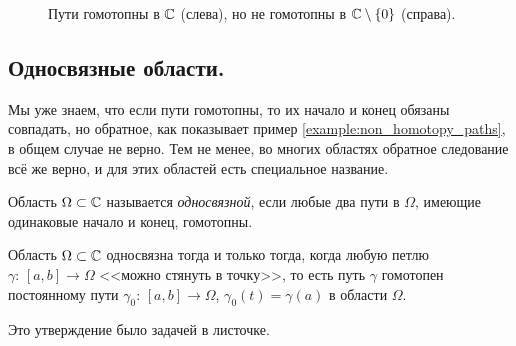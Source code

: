 \documentclass[../complex-analysis.tex]{subfiles}
\begin{document}
\begin{figure}[ht]
 \centering
 \caption{Пути гомотопны в $\mathbb{C}$ (слева), но не гомотопны в $\mathbb{C} \setminus \left\{ 0 \right\}$ (справа).}
 \label{fig:paths-without-homptopy}
\end{figure}

\subsection{Односвязные области.}

Мы уже знаем, что если пути гомотопны, то их начало и конец обязаны совпадать, но обратное, как показывает пример \ref{example:non_homotopy_paths}, в общем случае не верно. Тем не менее, во многих областях обратное следование всё же верно, и для этих областей есть специальное название.

\begin{df}
 Область $ \Omega \subset\mathbb{C} $ называется \emph{односвязной}, если любые два пути в $ \Omega $, имеющие одинаковые начало и конец, гомотопны.
\end{df}

\begin{claim}
 Область $ \Omega \subset \mathbb{C} $ односвязна тогда и только тогда, когда любую петлю $ \gamma \colon\,[a,b] \to \Omega $ <<можно стянуть в точку>>, то есть путь $ \gamma $ гомотопен постоянному пути $ \gamma_0 \colon\,[a,b] \to \Omega $, $ \gamma_0(t) = \gamma(a) $ в области $ \Omega $.
\end{claim}

Это утверждение было задачей в листочке.
\end{document}
